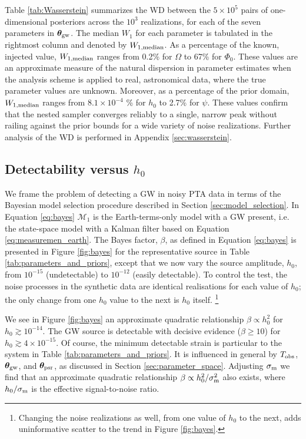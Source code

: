 \documentclass[fleqn,usenatbib,useAMS]{mnras}
\begin{document}
Table \ref{tab:Wasserstein} summarizes the WD between the $5\times 10^5$ pairs of one-dimensional posteriors across the $10^3$ realizations, for each of the seven parameters in ${\boldsymbol{\theta}}_{\rm gw}$. The median $W_1$ for each parameter is tabulated in the rightmost column and denoted by $W_{1,{\rm median}}$. As a percentage of the known, injected value, $W_{\rm 1,median}$ ranges from  0.2\% for $\Omega$ to 67\% for $\Phi_0$. These values are an approximate measure of the natural dispersion in parameter estimates when the analysis scheme is applied to real, astronomical data, where the true parameter values are unknown. Moreover, as a percentage of the prior domain, $W_{\rm 1,median}$ ranges from $8.1 \times 10^{-4}$ \% for $h_0$ to 2.7\% for $\psi$. These values confirm that the nested sampler converges reliably to a single, narrow peak without railing against the prior bounds for a wide variety of noise realizations. Further analysis of the WD is performed in Appendix \ref{sec:wasserstein}.



\subsection{Detectability versus $h_0$} \label{sec:detection}
We frame the problem of detecting a GW in noisy PTA data in terms of the Bayesian model selection procedure described in Section \ref{sec:model_selection}. In Equation \eqref{eq:bayes} $\mathcal{M}_1$ is the Earth-terms-only model with a GW present, i.e. the state-space model with a Kalman filter based on Equation \eqref{eq:measuremen_earth}. The Bayes factor, $\beta$, as defined in Equation \eqref{eq:bayes} is presented in Figure \ref{fig:bayes} for the representative source in Table \ref{tab:parameters_and_priors}, except that we now vary the source amplitude, $h_0$, from $10^{-15}$ (undetectable) to $10^{-12}$ (easily detectable). To control the test, the noise processes in the synthetic data are identical realisations for each value of $h_0$; the only change from one $h_0$ value to the next is $h_0$ itself. \footnote{Changing the noise realizations as well, from one value of $h_0$ to the next, adds uninformative scatter to the trend in Figure \ref{fig:bayes}.} \newline 

	
We see in Figure \ref{fig:bayes} an approximate quadratic relationship $\beta \propto h_0^2$ for $h_0 \gtrsim 10^{-14}$. The GW source is detectable with decisive evidence ($\beta \geq 10$) for $h_0 \gtrsim 4 \times 10^{-15}$. Of course, the minimum detectable strain is particular to the system in Table \ref{tab:parameters_and_priors}. It is influenced in general by $T_{\rm obs}$, ${\boldsymbol{\theta}}_{\rm gw}$, and ${\boldsymbol{\theta}}_{\rm psr}$, as discussed in Section \ref{sec:parameter_space}. Adjusting $\sigma_{\rm m}$ we find that an approximate quadratic relationship $\beta \propto h_0^2 / \sigma_{\rm m}^2$ also exists, where $h_0 / \sigma_{\rm m}$ is the effective signal-to-noise ratio. \newline 
\end{document}
